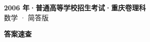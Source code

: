 \documentclass[zihao=-4, a4paper]{ctexart}
\begin{document}
\begin{center}
  {\Large\bfseries 2006 年·普通高等学校招生考试·重庆卷理科}\\[4pt]
  {\large 数学 · 简答版}
\end{center}
\medskip
{}

\clearpage
{}
\begin{center}{\Large\bfseries 答案速查}\end{center}
\medskip

\end{document}
